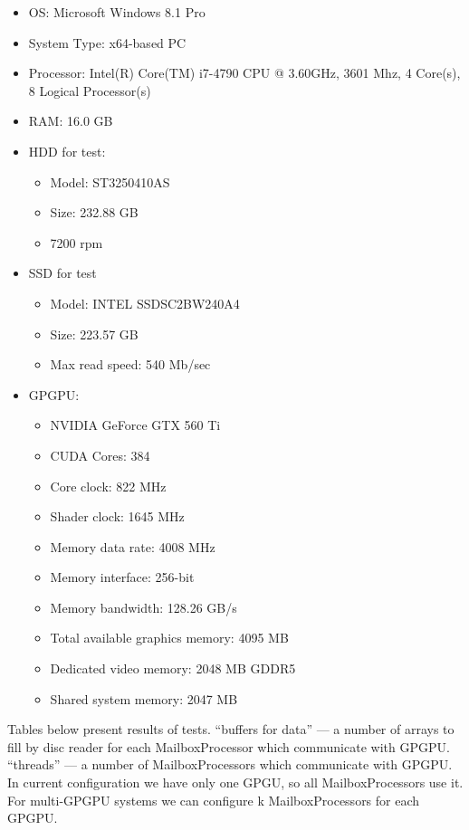 \begin{itemize}
\item OS: Microsoft Windows 8.1 Pro
\item System Type: x64-based PC
\item Processor: Intel(R) Core(TM) i7-4790 CPU @ 3.60GHz, 3601 Mhz, 4 Core(s), 8 Logical Processor(s)
\item RAM: 16.0 GB
\item HDD for test: 
\begin{itemize}
  \item Model: ST3250410AS
  \item Size: 232.88 GB
  \item 7200 rpm
\end{itemize}
 
\item SSD for test
\begin{itemize}
  \item Model: INTEL SSDSC2BW240A4
  \item Size: 223.57 GB
  \item Max read speed: 540 Mb/sec
\end{itemize}

\item GPGPU:
\begin{itemize}
  \item NVIDIA GeForce GTX 560 Ti
  \item CUDA Cores:     384 
  \item Core clock:     822 MHz 
  \item Shader clock:       1645 MHz
  \item Memory data rate:   4008 MHz
  \item Memory interface:   256-bit 
  \item Memory bandwidth:   128.26 GB/s
  \item Total available graphics memory:    4095 MB
  \item Dedicated video memory: 2048 MB GDDR5
  \item Shared system memory:   2047 MB
\end{itemize}
\end{itemize}

Tables below present results of tests. 
``buffers for data'' --- a number of arrays to fill by disc reader for each MailboxProcessor which communicate with GPGPU.
``threads'' --- a number of MailboxProcessors which communicate with GPGPU.
In current configuration we have  only one GPGU, so all MailboxProcessors use it.
For multi-GPGPU systems  we can configure k MailboxProcessors for each GPGPU.
 
